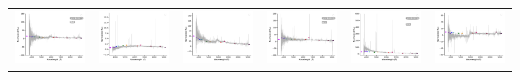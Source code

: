 \begin{center}
\begin{longtable}{l l l l l l }
    \includegraphics[width=0.3\linewidth, clip]{Figs/Figs-lamost/spec-55916-F5591602_sp01-125-STRIPE82-0042-018967.pdf} & \includegraphics[width=0.3\linewidth, clip]{Figs/Figs-lamost/spec-55916-F5591602_sp02-136-STRIPE82-0040-030039.pdf} & \includegraphics[width=0.3\linewidth, clip]{Figs/Figs-lamost/spec-55920-F5592001_sp09-085-STRIPE82-0032-003020.pdf} & \includegraphics[width=0.3\linewidth, clip]{Figs/Figs-lamost/spec-55920-F5592001_sp09-232-STRIPE82-0031-003242.pdf} & \includegraphics[width=0.3\linewidth, clip]{Figs/Figs-lamost/spec-55920-F5592001_sp15-046-STRIPE82-0030-004872.pdf} & \includegraphics[width=0.3\linewidth, clip]{Figs/Figs-lamost/spec-55920-F5592001_sp16-128-STRIPE82-0030-034826.pdf} \\

\end{longtable}
\end{center}
